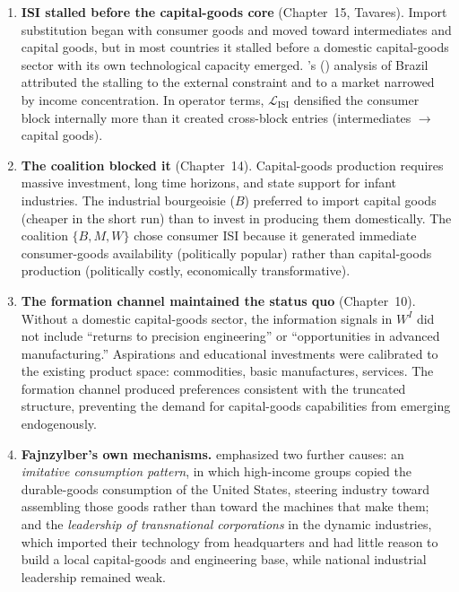 \documentclass[../structural_economics_book.tex]{subfiles}
\begin{document}
\begin{remark}\label{ch25:prop:three_reasons}
\begin{enumerate}
\item \textbf{ISI stalled before the capital-goods core} (Chapter~15, Tavares). Import substitution began with consumer goods and moved toward intermediates and capital goods, but in most countries it stalled before a domestic capital-goods sector with its own technological capacity emerged. \citeauthor{tavares1964auge}'s (\citeyear{tavares1964auge}) analysis of Brazil attributed the stalling to the external constraint and to a market narrowed by income concentration. In operator terms, $\mathcal{L}_{\text{ISI}}$ densified the consumer block internally more than it created cross-block entries (intermediates $\to$ capital goods).

\item \textbf{The coalition blocked it} (Chapter~14). Capital-goods production requires massive investment, long time horizons, and state support for infant industries. The industrial bourgeoisie ($B$) preferred to import capital goods (cheaper in the short run) than to invest in producing them domestically. The coalition $\{B, M, W\}$ chose consumer ISI because it generated immediate consumer-goods availability (politically popular) rather than capital-goods production (politically costly, economically transformative).

\item \textbf{The formation channel maintained the status quo} (Chapter~10). Without a domestic capital-goods sector, the information signals in $W^I$ did not include ``returns to precision engineering'' or ``opportunities in advanced manufacturing.'' Aspirations and educational investments were calibrated to the existing product space: commodities, basic manufactures, services. The formation channel produced preferences consistent with the truncated structure, preventing the demand for capital-goods capabilities from emerging endogenously.

\item \textbf{Fajnzylber's own mechanisms.} \citet{fajnzylber1983industrializacion} emphasized two further causes: an \emph{imitative consumption pattern}, in which high-income groups copied the durable-goods consumption of the United States, steering industry toward assembling those goods rather than toward the machines that make them; and the \emph{leadership of transnational corporations} in the dynamic industries, which imported their technology from headquarters and had little reason to build a local capital-goods and engineering base, while national industrial leadership remained weak.
\end{enumerate}
\end{remark}
\end{document}
